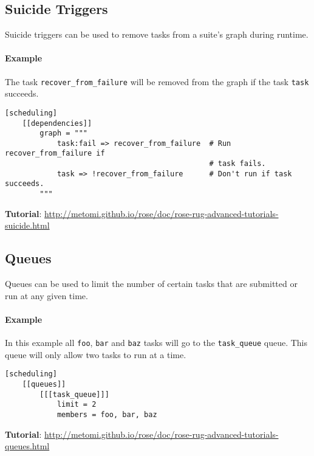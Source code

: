 \subsection{Suicide Triggers}

Suicide triggers can be used to remove tasks from a suite's graph during
runtime.

\paragraph*{Example}

The task \lstinline{recover_from_failure} will be removed from the graph if
the task \lstinline{task} succeeds.

\begin{lstlisting}
[scheduling]
    [[dependencies]]
        graph = """
            task:fail => recover_from_failure  # Run recover_from_failure if
                                               # task fails.
            task => !recover_from_failure      # Don't run if task succeeds.
        """
\end{lstlisting}

\begin{shaded*}
\textbf{Tutorial}: \url{http://metomi.github.io/rose/doc/rose-rug-advanced-tutorials-suicide.html}
\end{shaded*}

\subsection{Queues}

Queues can be used to limit the number of certain tasks that are submitted or
run at any given time.

\paragraph*{Example}

In this example all \lstinline{foo}, \lstinline{bar} and \lstinline{baz} tasks
will go to the \lstinline{task_queue} queue. This queue will only allow two
tasks to run at a time.

\begin{lstlisting}
[scheduling]
    [[queues]]
        [[[task_queue]]]
            limit = 2
            members = foo, bar, baz
\end{lstlisting}

\begin{shaded*}
\textbf{Tutorial}: \url{http://metomi.github.io/rose/doc/rose-rug-advanced-tutorials-queues.html}
\end{shaded*}


